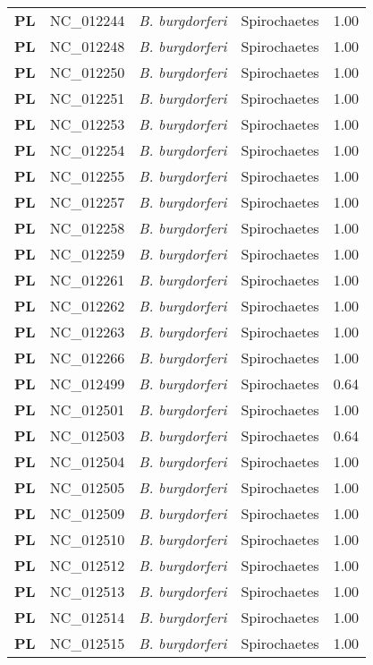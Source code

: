 \begin{adjustwidth}{-3cm}{2cm}
{\begin{supertabular}{>{\bfseries}l|p{0.1\textwidth}p{0.14\textwidth}l|l}
PL & NC\_012244 & \textit{B. burgdorferi} & Spirochaetes & 1.00\\
PL & NC\_012248 & \textit{B. burgdorferi} & Spirochaetes & 1.00\\
PL & NC\_012250 & \textit{B. burgdorferi} & Spirochaetes & 1.00\\
PL & NC\_012251 & \textit{B. burgdorferi} & Spirochaetes & 1.00\\
PL & NC\_012253 & \textit{B. burgdorferi} & Spirochaetes & 1.00\\
PL & NC\_012254 & \textit{B. burgdorferi} & Spirochaetes & 1.00\\
PL & NC\_012255 & \textit{B. burgdorferi} & Spirochaetes & 1.00\\
PL & NC\_012257 & \textit{B. burgdorferi} & Spirochaetes & 1.00\\
PL & NC\_012258 & \textit{B. burgdorferi} & Spirochaetes & 1.00\\
PL & NC\_012259 & \textit{B. burgdorferi} & Spirochaetes & 1.00\\
PL & NC\_012261 & \textit{B. burgdorferi} & Spirochaetes & 1.00\\
PL & NC\_012262 & \textit{B. burgdorferi} & Spirochaetes & 1.00\\
PL & NC\_012263 & \textit{B. burgdorferi} & Spirochaetes & 1.00\\
PL & NC\_012266 & \textit{B. burgdorferi} & Spirochaetes & 1.00\\
PL & NC\_012499 & \textit{B. burgdorferi} & Spirochaetes & 0.64\\
PL & NC\_012501 & \textit{B. burgdorferi} & Spirochaetes & 1.00\\
PL & NC\_012503 & \textit{B. burgdorferi} & Spirochaetes & 0.64\\
PL & NC\_012504 & \textit{B. burgdorferi} & Spirochaetes & 1.00\\
PL & NC\_012505 & \textit{B. burgdorferi} & Spirochaetes & 1.00\\
PL & NC\_012509 & \textit{B. burgdorferi} & Spirochaetes & 1.00\\
PL & NC\_012510 & \textit{B. burgdorferi} & Spirochaetes & 1.00\\
PL & NC\_012512 & \textit{B. burgdorferi} & Spirochaetes & 1.00\\
PL & NC\_012513 & \textit{B. burgdorferi} & Spirochaetes & 1.00\\
PL & NC\_012514 & \textit{B. burgdorferi} & Spirochaetes & 1.00\\
PL & NC\_012515 & \textit{B. burgdorferi} & Spirochaetes & 1.00\\

\end{supertabular}}
\end{adjustwidth}

